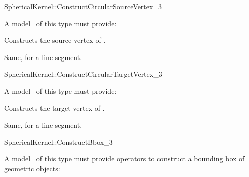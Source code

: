 \begin{ccRefFunctionObjectConcept}{SphericalKernel::ConstructCircularSourceVertex_3} 


A model \ccVar\ of this type must provide:

{Constructs the source vertex of .}

{Same, for a line segment.}

\end{ccRefFunctionObjectConcept}
\begin{ccRefFunctionObjectConcept}{SphericalKernel::ConstructCircularTargetVertex_3} 


A model \ccVar\ of this type must provide:

{Constructs the target vertex of .}

{Same, for a line segment.}

\end{ccRefFunctionObjectConcept}
\begin{ccRefFunctionObjectConcept}{SphericalKernel::ConstructBbox_3}


A model \ccVar\ of this type must provide operators to construct 
a bounding box of geometric objects:


{}

{}

{}

\end{ccRefFunctionObjectConcept}


